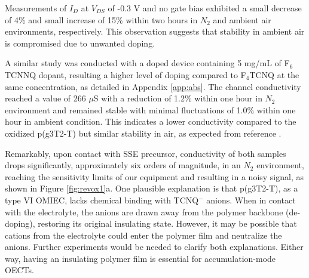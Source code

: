 Measurements of $I_{D}$ at $V_{DS}$ of -0.3 V and no gate bias exhibited a small decrease of 4\% and small increase of 15\% within two hours in $N_{2}$ and ambient air environments, respectively. This observation suggests that stability in ambient air is compromised due to unwanted doping.

A similar study was conducted with a doped device containing 5 mg/mL of F$_{6}$TCNNQ dopant, resulting a higher level of doping compared to F$_{4}$TCNQ at the same concentration, as detailed in Appendix \ref{app:abs}. The channel conductivity reached a value of 266 $\mu$S with a reduction of 1.2\% within one hour in $N_{2}$ environment and remained stable with minimal fluctuations of 1.0\% within one hour in ambient condition. This indicates a lower conductivity compared to the oxidized p(g3T2-T) but similar stability in air, as expected from reference \cite{tanTuningOrganicElectrochemical2022}.

Remarkably, upon contact with SSE precursor, conductivity of both samples drops significantly, approximately six orders of magnitude, in an $N_{2}$ environment, reaching the sensitivity limits of our equipment and resulting in a noisy signal, as shown in Figure \ref{fig:revox1}a. One plausible explanation is that p(g3T2-T), as a type VI OMIEC, lacks chemical binding with TCNQ$^{-}$ anions. When in contact with the electrolyte, the anions are drawn away from the polymer backbone (de-doping), restoring its original insulating state. However, it may be possible that cations from the electrolyte could enter the polymer film and neutralize the anions. Further experiments would be needed to clarify both explanations. Either way, having an insulating polymer film is essential for accumulation-mode OECTs.

